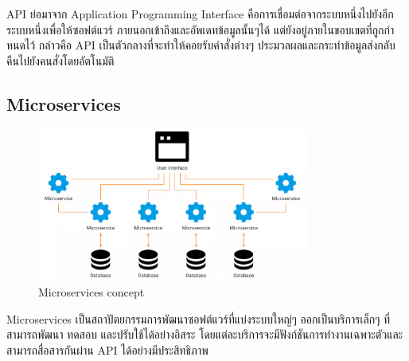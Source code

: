     \qquad API ย่อมาจาก Application Programming Interface คือการเชื่อมต่อจากระบบหนึ่งไปยังอีกระบบหนึ่งเพื่อให้ซอฟต์แวร์
    ภายนอกเข้าถึงและอัพเดทข้อมูลนั้นๆได้ แต่ยังอยู่ภายในขอบเขตที่ถูกกําหนดไว้ กล่าวคือ API เป็นตัวกลางที่จะทําให้คอยรับคําสั่งต่างๆ 
    ประมวลผลและกระทําข้อมูลส่งกลับคืนไปยังคนสั่งโดยอัตโนมัติ \cite{RESTAPI}
  \subsection{Microservices}
    \begin{figure}[!h]
      \centering
      \includegraphics[width=0.8\textwidth]{image/Background/Microservices.png}
      \caption[Microservices]{Microservices concept}
      \label{fig:microservices_pic}
    \end{figure}
    \FloatBarrier
    \qquad Microservices เป็นสถาปัตยกรรมการพัฒนาซอฟต์แวร์ที่แบ่งระบบใหญ่ๆ ออกเป็นบริการเล็กๆ ที่สามารถพัฒนา
    ทดสอบ และปรับใช้ได้อย่างอิสระ โดยแต่ละบริการจะมีฟังก์ชันการทำงานเฉพาะตัวและสามารถสื่อสารกันผ่าน API 
    ได้อย่างมีประสิทธิภาพ \cite{Microservices}

